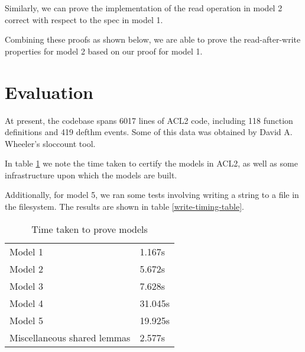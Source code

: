 \documentclass[format=sigconf,review=true]{acmart}
\begin{document}
Similarly, we can prove the implementation of the read operation in
model 2 correct with respect to the spec in model 1.


Combining these proofs as shown below, we are able to prove the read-after-write
properties for model 2 based on our proof for model 1.


\section{Evaluation}
At present, the codebase spans 6017 lines of ACL2 code, including 118
function definitions and 419 defthm events. Some of this data was
obtained by David A. Wheeler's sloccount tool.

In table \ref{certification-timing-table} we note the time taken to certify
the models in ACL2, as well as some infrastructure upon which the
models are built.

Additionally, for model 5, we ran some tests involving writing a
string to a file in the filesystem. The results are shown in table
\ref{write-timing-table}.

\begin{table}[]
  \centering
  \caption{Time taken to prove models}
  \label{certification-timing-table}
  \begin{tabular}{ll}
    Model 1 & 1.167s \\
    Model 2 & 5.672s \\
    Model 3 & 7.628s \\
    Model 4 & 31.045s \\
    Model 5 & 19.925s \\
    Miscellaneous shared lemmas & 2.577s \\
  \end{tabular}
\end{table}
\end{document}
